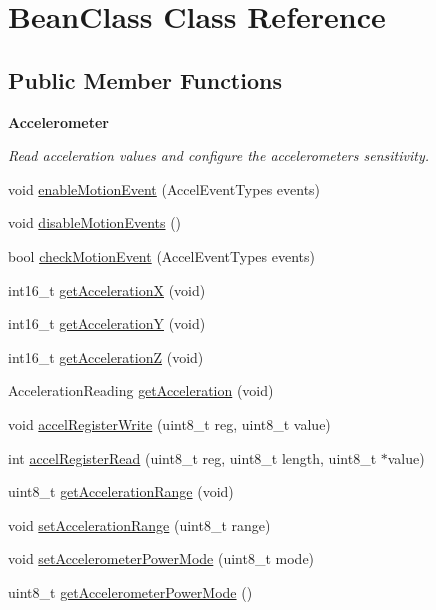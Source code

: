 \hypertarget{class_bean_class}{}\section{Bean\+Class Class Reference}
\label{class_bean_class}
\subsection*{Public Member Functions}
\begin{Indent}{\bf Accelerometer}\par
{\em Read acceleration values and configure the accelerometer\textquotesingle{}s sensitivity. }\begin{DoxyCompactItemize}
\item 
void \hyperlink{class_bean_class_a9d2f98bbb1b8a715c0fe549c438f44ed}{enable\+Motion\+Event} (Accel\+Event\+Types events)
\item 
void \hyperlink{class_bean_class_a0f9fb65a465070f9f3e9cdf4f2687bdc}{disable\+Motion\+Events} ()
\item 
bool \hyperlink{class_bean_class_a75492018fa92ad32c06a12ce456dc74c}{check\+Motion\+Event} (Accel\+Event\+Types events)
\item 
int16\+\_\+t \hyperlink{class_bean_class_a00cf73de73eeb00d220efa32a830d6ef}{get\+Acceleration\+X} (void)
\item 
int16\+\_\+t \hyperlink{class_bean_class_aba0554ca18558748b67205bd5bdcaeac}{get\+Acceleration\+Y} (void)
\item 
int16\+\_\+t \hyperlink{class_bean_class_a5c977e7b185ebc038335228d8ef1d0b9}{get\+Acceleration\+Z} (void)
\item 
Acceleration\+Reading \hyperlink{class_bean_class_a53f2174dd2f3c2907acc3355cef64842}{get\+Acceleration} (void)
\item 
void \hyperlink{class_bean_class_a47244506c985ef7aead3695811002ad2}{accel\+Register\+Write} (uint8\+\_\+t reg, uint8\+\_\+t value)
\item 
int \hyperlink{class_bean_class_a3e743eb8cc8e5e04364f53801b8fe83e}{accel\+Register\+Read} (uint8\+\_\+t reg, uint8\+\_\+t length, uint8\+\_\+t $\ast$value)
\item 
uint8\+\_\+t \hyperlink{class_bean_class_ad08dec6f240de8a53f110ddf066f6ab2}{get\+Acceleration\+Range} (void)
\item 
void \hyperlink{class_bean_class_acb8e9a741e2538393256f95d27c4571d}{set\+Acceleration\+Range} (uint8\+\_\+t range)
\item 
void \hyperlink{class_bean_class_a4eebb09ead4b598ef56c359ed14141be}{set\+Accelerometer\+Power\+Mode} (uint8\+\_\+t mode)
\item 
uint8\+\_\+t \hyperlink{class_bean_class_afb4f9a75f687547ff8f6cb4146ab30fa}{get\+Accelerometer\+Power\+Mode} ()
\end{DoxyCompactItemize}
\end{Indent}
